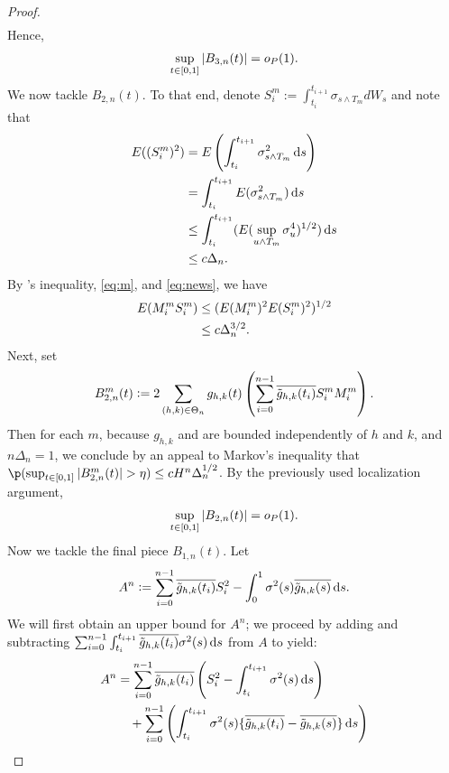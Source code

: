 \begin{proof}
\begin{align}
  \label{}
\end{align}
Hence,
\begin{align}
  \sup_{t \in [0,1]} \vert B_{3,n}(t)\vert = o_{P}( 1).
  \label{}
\end{align}
We now tackle $B_{2,n}(t)$. To that end, denote  $S_i^m := \int_{t_i}^{t_{i + 1}} \sigma_{s \wedge T_m} d W_s$ and  note that 
\begin{align}
  E((S_i^m)^2)   & = E\left(\int_{t_i}^{t_{i+1}} \sigma^2_{s \wedge T_m} \D s \right)\notag \\
                & = \int_{t_i}^{t_{i+1}} E(\sigma^2_{s \wedge T_m}) \D s \notag \\
                & \le \int_{t_i}^{t_{i+1}} (E(\sup_{u \wedge T_m} \sigma^4_{u})^{1/2}) \D s \notag \\
  & \le c \Delta_n.\label{eq:news}
\end{align}
By \holder's inequality, \eqref{eq:m}, and \eqref{eq:news},  we have
\begin{align}
  E(M_i^m S_i^m) & \le (E(M_i^m)^2 E( S^m_i)^2)^{1/2} \notag\\
  & \le c\Delta_n^{3/2}.\label{eq:ms}
\end{align}
Next,  set 
\begin{align}
 B_{2,n}^m(t) := 2 \sum_{(h,k) \in \Theta_n} g_{h,k}(t)\left(\sum_{i=0}^{n-1} \overline{\tilde{g}_{h,k}(t_i)} S_i^m M_i^m \right) \notag.
  \label{}
\end{align}
Then for each $m$,  because  $g_{h,k}$ and \tghk  are bounded independently of $h$ and $k$, and $n\Delta_n = 1$, we conclude by an appeal to Markov's inequality  that  $\p( \sup_{t \in \domain} \vert B_{2,n}^m(t)\vert > \eta) \le  c H^n \Delta_n^{1/2}$. By the previously used localization argument, 
\begin{align}
  \sup_{t\in[0,1]}\vert B_{2,n}(t)\vert = o_{P}(1).
  \label{}
\end{align}
Now we tackle the final piece $B_{1,n}(t)$. Let 
\begin{align}
  A^n  := \sum_{i=0}^{n-1}\btghki S_i^2 -\int_{0}^{1} \sigma^2(s) \btghks \D s.
\end{align}
We will first obtain an upper bound for $A^n$; we proceed by adding and subtracting $\sumin\int_{t_i}^{t_{i+1}}\btghki \sigma^2(s)  \D s$  from  $A$ to yield: 
\begin{align}
  A^n & = \sumin\btghki \left(S_i^2 -\int_{t_i}^{t_{i+1}} \sigma^2(s) \D s\right)\notag \\
  &\quad +  \sumin\left(\int_{t_i}^{t_{i+1}} \sigma^2(s) \{\btghki - \btghks\} \D s\right) \notag\\

\end{align}
\end{proof}
